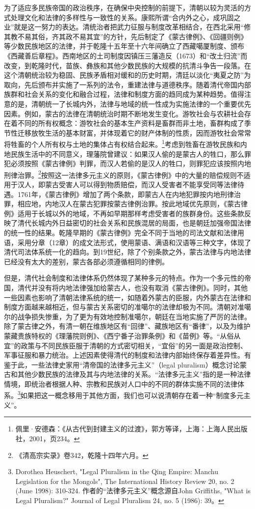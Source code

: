 \documentclass[a4paper, 12pt, openright]{ctexbook}
\begin{document}
为了适应多民族帝国的政治秩序，在确保中央控制的前提下，清朝以较为灵活的方式处理文化和法律的多样性与一致性的关系。康熙所谓“合内外之心，成巩固之业”就是这一努力的表达。清统治者把武力征服与制度改革相结合，在西北采用“修其教不易其俗，齐其政不易其宜”的方针，先后制定了《蒙古律例》、《回疆则例》等少数民族地区的法律，并于乾隆十五年至十六年间确立了西藏噶厦制度、颁布《西藏善后章程》。西南地区的土司制度因镇压三藩造反（1673）和“改土归流”而改变，到乾隆时代，苗族、彝族和其他少数民族的大规模的抗清斗争告一段落。在这个清朝统治较为稳固、民族矛盾相对缓和的历史时期，清廷以淡化“夷夏之防”为取向，先后颁布并实施了一系列的法令，重建法律与道德秩序。随着清代帝国内部族群和社会关系的变化和融合过程，法律和制度方面的趋同成为某种趋势。值得注意的是，清朝统一了长城内外，法律与地域的统一性成为实施法律的一个重要优先因素。例如，蒙古的法律在清朝统治时期不断地发生变化。游牧社会与农耕社会存在着不同的所有权概念：游牧社会的基本生产资料是畜群而非土地，畜群构成了季节性迁移放牧生活的基本财富，并体现着它的财产体制的性质，因而游牧社会常常将牲畜的个人所有权与土地的集体占有权结合起来。\footnote{佩里·安德森：《从古代到封建主义的过渡》，郭方等译，上海：上海人民出版社，2001，页234。}考虑到牲畜在游牧民族和内地民族生活中的不同意义，理藩院曾建议：如果汉人偷的是蒙古人的牲口，那么罪犯必须按照《蒙古律例》判罪，而汉人若偷的是汉人的牲口，则罪犯应该按照内地刑律治罪。\footnote{《清高宗实录》卷342，乾隆十四年六月。}按照这一法律多元主义的原则，《蒙古律例》中的大量的赔偿规则不适用于汉人，即蒙古受害人可以得到物质赔偿，而汉人受害者不能享受同等法律待遇。1761年，《蒙古律例》增加了两个条款，即蒙古人在内地犯罪按内地刑律治罪，相应地，内地汉人在蒙古犯罪按蒙古律例治罪。按此地域优先原则，《蒙古律例》适用于长城以外的地域，不再如早期那样考虑受害者的族群身份。这些条款反映了清代长城内外日益密切的社会关系和民族混居的局面，也是朝廷加强帝国法律的统一性的结果。乾隆早期的《蒙古律例》完全不同于当地的司法文献和法律用语，采用分章（12章）的成文法形式，使用蒙语、满语和汉语等三种文字，体现了清代司法体系统一化的趋向。到19世纪，除了个别条款之外，蒙古法律与内地法律已经没有太大的差别，蒙古各部必须遵循相同的律例。

但是，清代社会制度和法律体系仍然体现了某种多元的特点。作为一个多元性的帝国，清代并没有将内地法律强加给蒙古人，也没有取消《蒙古律例》。同时，其他一些因素也影响了清朝法律系统的统一，如随着外蒙古的臣服，内外蒙古在法律和制度方面越来越相近，但与蒙古关系密切的准噶尔的法律却极为不同。清朝对准噶尔的战争损失惨重，为了更为有效地控制准噶尔，朝廷在当地实施了严厉的法律。除了蒙古律之外，有清一朝在维族地区有“回律”、藏族地区有“番律”，以及为维护蒙藏贵族特权的《理藩院则例》、《西宁番子治罪条例》和《苗例》等。“从俗从宜”的政策与不同民族臣服于清朝的方式密切相关，“宜俗”的另一面是政治控制、军事征服和暴力统治。上述因素使得清代的制度和法律内部始终保存着差异性。有鉴于此，一些法律史家用“清帝国的法律多元主义”（legal pluralism）概念讨论蒙古和其他少数民族的法律及其与内地法律的关系。“法律多元主义”指的是一种法律情境，即统治者根据人种、宗教和民族对人口中的不同的群体实施不同的法律体系。\footnote{Dorothea Heuschert, "Legal Pluralism in the Qing Empire: Manchu Legislation for the Mongols", The International History Review 20, no. 2 (June 1998): 310-324. 作者的“法律多元主义”概念源自John Griffiths, "What is Legal Pluralism?" Journal of Legal Pluralism 24, no. 5 (1986): 39。}如果把这一概念移用于其他方面，我们也可以说清朝存在着一种“制度多元主义”。
\end{document}
